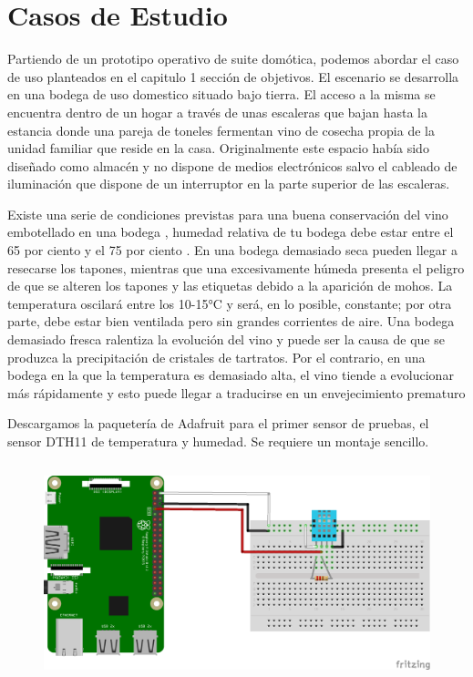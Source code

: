\cleardoublepage

\chapter{Casos de Estudio}
\label{makereference6}

Partiendo de un prototipo operativo de suite domótica, podemos abordar el caso de uso planteados en el capitulo 1 sección de objetivos. El escenario se desarrolla en una bodega de uso domestico situado bajo tierra. El acceso a la misma se encuentra dentro de un hogar a través de unas escaleras que bajan hasta la estancia donde una pareja de toneles fermentan vino de cosecha propia de la unidad familiar que reside en la casa. Originalmente este espacio había sido diseñado como almacén y no dispone de medios electrónicos salvo el cableado de iluminación que dispone de un interruptor en la parte superior de las escaleras.

Existe una serie de condiciones previstas para una buena conservación del vino embotellado en una bodega , humedad relativa de tu bodega debe estar entre el 65 por ciento y el 75 por ciento . En una bodega demasiado seca pueden llegar a resecarse los tapones, mientras que una excesivamente húmeda presenta el peligro de que se alteren los tapones y las etiquetas debido a la aparición de mohos.
La temperatura oscilará entre los 10-15°C y será, en lo posible, constante; por otra parte, debe estar bien ventilada pero sin grandes corrientes de aire. Una bodega demasiado fresca ralentiza la evolución del vino y puede ser la causa de que se produzca la precipitación de cristales de tartratos. Por el contrario, en una bodega en la que la temperatura es demasiado alta, el vino tiende a evolucionar más rápidamente y esto puede llegar a traducirse en un envejecimiento prematuro

Descargamos la paquetería de Adafruit para el primer sensor de pruebas, el sensor DTH11 de temperatura y humedad.
Se requiere un montaje sencillo.
\begin{figure}[hbt!]
\centering
\includegraphics[height=2.5in]{figures/nodo_1.png}
\end{figure}

